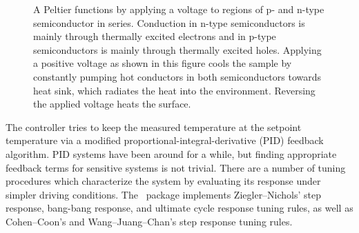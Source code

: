 \begin{figure}
  \begin{center}
    \caption{A Peltier functions by applying a voltage to regions of
      p- and n-type semiconductor in series.  Conduction in n-type
      semiconductors is mainly through thermally excited electrons and
      in p-type semiconductors is mainly through thermally excited
      holes.  Applying a positive voltage as shown in this figure
      cools the sample by constantly pumping hot conductors in both
      semiconductors towards heat sink, which radiates the heat into
      the environment.  Reversing the applied voltage heats the
      surface.\label{fig:peltier}}
  \end{center}
\end{figure}

The controller tries to keep the measured temperature at the setpoint
temperature via a modified proportional-integral-derivative (PID)
feedback algorithm.  PID systems have been around for a
while\citep{ziegler42}, but finding appropriate feedback terms for
sensitive systems is not trivial.  There are a number of tuning
procedures which characterize the system by evaluating its response
under simpler driving conditions.  The \pypid\ package implements
Ziegler--Nichols' step response\citep{ziegler42}, bang-bang response,
and ultimate cycle response\citep{ziegler42} tuning rules, as well as
Cohen--Coon's\citep{cohen53} and Wang--Juang--Chan's\citep{wang95}
step response tuning rules\citep{astrom93}.
%
